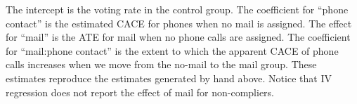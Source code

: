 \documentclass[11pt,notitlepage]{article}\usepackage[]{graphicx}\usepackage[]{color}
\begin{document}
\begin{enumerate}[a)]
The intercept is the voting rate in the control group. The coefficient for ``phone contact'' is the estimated CACE for phones when no mail is assigned.  The effect for ``mail'' is the ATE for mail when no phone calls are assigned. The coefficient for ``mail:phone contact'' is the extent to which the apparent CACE of phone calls increases when we move from the no-mail to the mail group. These estimates reproduce the estimates generated by hand above. Notice that IV regression does not report the effect of mail for non-compliers.
\end{enumerate}
\end{document}

